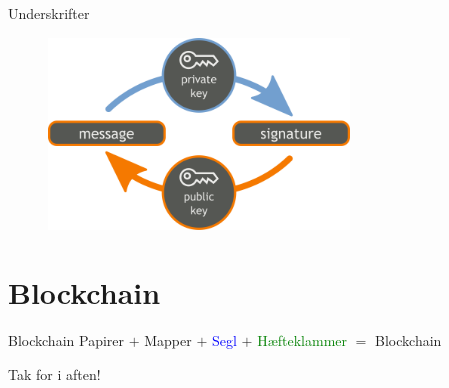 \documentclass[usenames, dvipsnames]{beamer}
\begin{document}
  \begin{frame}{Underskrifter}
    \begin{figure}[ht!]
    \centering
    \includegraphics[width=80mm]{images/signature.png}
    \end{figure}
  \end{frame}
\section{Blockchain}
  \begin{frame}{Blockchain}
      \center \textcolor{Emerald}{Papirer} $+$ \textcolor{CarnationPink}{Mapper} $+$ \textcolor{Blue}{Segl} $+$ \textcolor{Green}{Hæfteklammer} $=$ \textcolor{Dandelion}{Blockchain}
  \end{frame}
  \begin{frame}{}
    \center \huge Tak for i aften! \\
  \end{frame}
\end{document}
